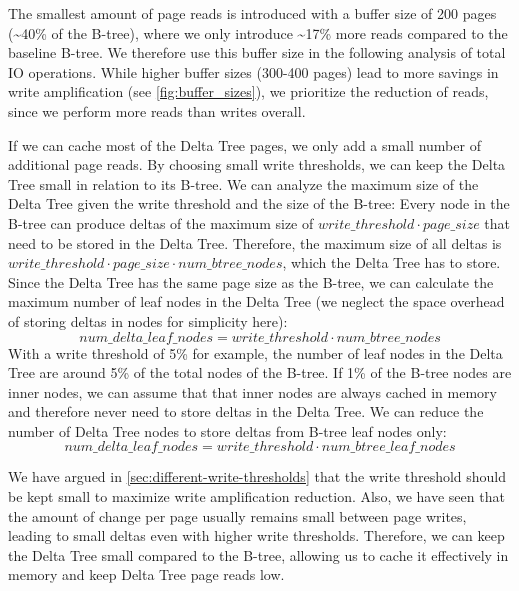 The smallest amount of page reads is introduced with a buffer size of 200 pages (\textasciitilde40\% of the B-tree), where we only introduce \textasciitilde17\% more reads compared to the baseline B-tree.
We therefore use this buffer size in the following analysis of total \ac{IO} operations.
While higher buffer sizes (300-400 pages) lead to more savings in write amplification (see \autoref{fig:buffer_sizes}), we prioritize the reduction of reads, since we perform more reads than writes overall.

If we can cache most of the Delta Tree pages, we only add a small number of additional page reads.
By choosing small write thresholds, we can keep the Delta Tree small in relation to its B-tree.
We can analyze the maximum size of the Delta Tree given the write threshold and the size of the B-tree:
Every node in the B-tree can produce deltas of the maximum size of $write\_threshold \cdot page\_size$ that need to be stored in the Delta Tree.
Therefore, the maximum size of all deltas is $write\_threshold \cdot page\_size \cdot num\_btree\_nodes$, which the Delta Tree has to store.
Since the Delta Tree has the same page size as the B-tree, we can calculate the maximum number of leaf nodes in the Delta Tree (we neglect the space overhead of storing deltas in nodes for simplicity here):
$$num\_delta\_leaf\_nodes =  write\_threshold \cdot num\_btree\_nodes$$
With a write threshold of 5\% for example, the number of leaf nodes in the Delta Tree are around 5\% of the total nodes of the B-tree.
If 1\% of the B-tree nodes are inner nodes, we can assume that that inner nodes are always cached in memory and therefore never need to store deltas in the Delta Tree.
We can reduce the number of Delta Tree nodes to store deltas from B-tree leaf nodes only:
$$num\_delta\_leaf\_nodes =  write\_threshold \cdot num\_btree\_leaf\_nodes$$

We have argued in \autoref{sec:different-write-thresholds} that the write threshold should be kept small to maximize write amplification reduction.
Also, we have seen that the amount of change per page usually remains small between page writes, leading to small deltas even with higher write thresholds.
Therefore, we can keep the Delta Tree small compared to the B-tree, allowing us to cache it effectively in memory and keep Delta Tree page reads low.


